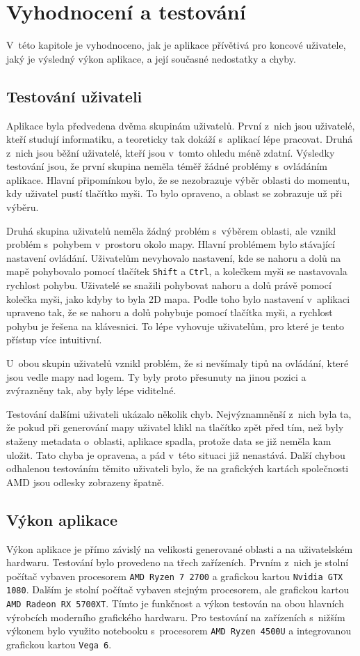 \chapter{Vyhodnocení a testování}
V~této kapitole je vyhodnoceno, jak je aplikace přívětivá pro koncové uživatele, jaký je výsledný výkon aplikace, a její současné nedostatky a chyby.

\section{Testování uživateli}
Aplikace byla předvedena dvěma skupinám uživatelů. První z~nich jsou uživatelé, kteří studují informatiku, a teoreticky tak dokáží s~aplikací lépe pracovat. Druhá z~nich jsou běžní uživatelé, kteří jsou v~tomto ohledu méně zdatní. Výsledky testování jsou, že první skupina neměla téměř žádné problémy s~ovládáním aplikace. Hlavní připomínkou bylo, že se nezobrazuje výběr oblasti do momentu, kdy uživatel pustí tlačítko myši. To bylo opraveno, a oblast se zobrazuje už při výběru.

Druhá skupina uživatelů neměla žádný problém s~výběrem oblasti, ale vznikl problém s~pohybem v~prostoru okolo mapy. Hlavní problémem bylo stávající nastavení ovládání. Uživatelům nevyhovalo nastavení, kde se nahoru a dolů na mapě pohybovalo pomocí tlačítek \verb|Shift| a \verb|Ctrl|, a kolečkem myši se nastavovala rychlost pohybu. Uživatelé se snažili pohybovat nahoru a dolů právě pomocí kolečka myši, jako kdyby to byla 2D mapa. Podle toho bylo nastavení v~aplikaci upraveno tak, že se nahoru a dolů pohybuje pomocí tlačítka myši, a rychlost pohybu je řešena na klávesnici. To lépe vyhovuje uživatelům, pro které je tento přístup více intuitivní.

U~obou skupin uživatelů vznikl problém, že si nevšímaly tipů na ovládání, které jsou vedle mapy nad logem. Ty byly proto přesunuty na jinou pozici a zvýrazněny tak, aby byly lépe viditelné.

Testování dalšími uživateli ukázalo několik chyb. Nejvýznamněnší z~nich byla ta, že pokud při generování mapy uživatel klikl na tlačítko zpět před tím, než byly staženy metadata o~oblasti, aplikace spadla, protože data se již neměla kam uložit. Tato chyba je opravena, a pád v~této situaci již nenastává. Další chybou odhalenou testováním těmito uživateli bylo, že na grafických kartách společnosti AMD jsou odlesky zobrazeny špatně.

\section{Výkon aplikace}
Výkon aplikace je přímo závislý na velikosti generované oblasti a na uživatelském hardwaru. Testování bylo provedeno na třech zařízeních. Prvním z~nich je stolní počítač vybaven procesorem \verb|AMD Ryzen 7 2700| a grafickou kartou \verb|Nvidia GTX 1080|. Dalším je stolní počítač vybaven stejným procesorem, ale grafickou kartou \verb|AMD Radeon RX 5700XT|. Tímto je funkčnost a výkon testován na obou hlavních výrobcích moderního grafického hardwaru. Pro testování na zařízeních s~nižším výkonem bylo využito notebooku s~procesorem \verb|AMD Ryzen 4500U| a integrovanou grafickou kartou \verb|Vega 6|.

